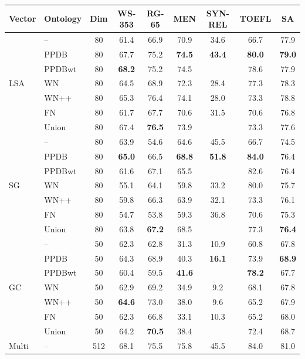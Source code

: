 \documentclass[11pt]{article}
\begin{document}
\begin{table}[!tbh]
  \centering
  \small
  \begin{tabular}{l|l|c||c|c|c||c|c||c}
Vector & Ontology & Dim & WS-353 & RG-65 & MEN & SYN-REL & TOEFL & SA \\
\hline
\multirow{7}{*}{LSA} & -- & 80 & 61.4 & 66.9 & 70.9 & 34.6 & 66.7 & 77.9\\

& PPDB & 80 & 67.7 & 75.2 & \textbf{74.5} & \textbf{43.4} & \textbf{80.0} & \textbf{79.0}\\
& PPDBwt & 80 & \textbf{68.2} & 75.2 & 74.5 & & 78.6 & 77.9\\
& WN & 80 & 64.5 & 68.9 & 72.3 & 28.4 & 77.3 & 78.3\\
& WN++ & 80 & 65.3 & 76.4 & 74.1 & 28.0 & 73.3 & 78.8\\
& FN & 80 & 61.7 & 67.7 & 70.6 & 31.5 & 70.6 & 76.8\\
& Union & 80 & 67.4 & \textbf{76.5} & 73.9 & & 73.3 & 77.6\\
\hline\hline
\multirow{7}{*}{SG} & -- & 80 & 63.9 & 54.6 & 64.6 & 45.5 & 66.7 & 74.5 \\

& PPDB & 80 & \textbf{65.0} & 66.5 & \textbf{68.8} & \textbf{51.8} & \textbf{84.0} & 76.4\\
& PPDBwt & 80 & 61.6 & 67.1 & 65.5 & & 82.6 &76.4\\
& WN & 80 & 55.1 & 64.1 & 59.8 & 33.2 & 80.0 & 75.7 \\
& WN++ & 80 & 59.8 & 66.3 & 63.9 & 32.1 & 73.3 & 76.1 \\
& FN & 80 & 54.7 & 53.8 & 59.3 & 36.8 & 70.6 & 75.3\\
& Union & 80 & 63.8 & \textbf{67.2} & 68.5 & & 77.3 & \textbf{76.4} \\
\hline\hline
\multirow{7}{*}{GC} & -- & 50 & 62.3 & 62.8 & 31.3 & 10.9 & 60.8 & 67.8 \\

& PPDB & 50 & 64.3 & 68.9 & 40.3& \textbf{16.1} & 73.9 & \textbf{68.9}\\
& PPDBwt & 50 & 60.4 & 59.5 & \textbf{41.6} & & \textbf{78.2} & 67.7\\
& WN & 50 & 62.9 & 69.2 & 34.9 & 9.2 & 68.1 & 67.8 \\
& WN++ & 50 & \textbf{64.6} & 73.0 & 38.0 & 9.6 & 65.2 & 67.9 \\
& FN & 50 & 62.3 & 66.8 & 33.1 & 10.3 & 65.2 & 68.0\\
& Union & 50 & 64.2 & \textbf{70.5} & 38.4 & & 72.4 & 68.7 \\
\hline\hline
\multirow{7}{*}{Multi} & -- & 512 & 68.1 & 75.5 & 75.8 & 45.5 & 84.0 & 81.0 \\


\end{tabular}
\end{table}
\end{document}
